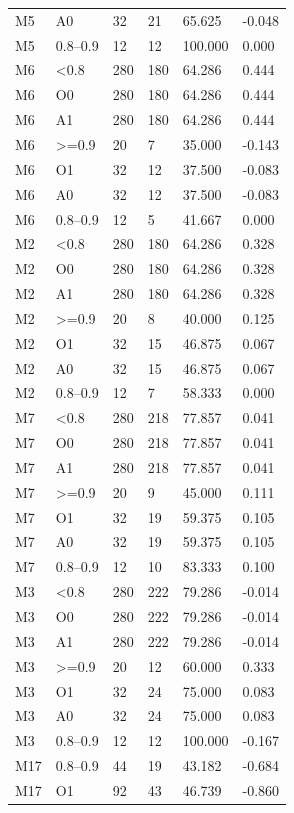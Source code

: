 {\begin{longtable}{llllll}
M5 & A0 & 32 & 21 & 65.625 & -0.048 \\
M5 & 0.8–0.9 & 12 & 12 & 100.000 & 0.000 \\
M6 & \textless{}0.8 & 280 & 180 & 64.286 & 0.444 \\
M6 & O0 & 280 & 180 & 64.286 & 0.444 \\
M6 & A1 & 280 & 180 & 64.286 & 0.444 \\
M6 & \textgreater{}=0.9 & 20 & 7 & 35.000 & -0.143 \\
M6 & O1 & 32 & 12 & 37.500 & -0.083 \\
M6 & A0 & 32 & 12 & 37.500 & -0.083 \\
M6 & 0.8–0.9 & 12 & 5 & 41.667 & 0.000 \\
M2 & \textless{}0.8 & 280 & 180 & 64.286 & 0.328 \\
M2 & O0 & 280 & 180 & 64.286 & 0.328 \\
M2 & A1 & 280 & 180 & 64.286 & 0.328 \\
M2 & \textgreater{}=0.9 & 20 & 8 & 40.000 & 0.125 \\
M2 & O1 & 32 & 15 & 46.875 & 0.067 \\
M2 & A0 & 32 & 15 & 46.875 & 0.067 \\
M2 & 0.8–0.9 & 12 & 7 & 58.333 & 0.000 \\
M7 & \textless{}0.8 & 280 & 218 & 77.857 & 0.041 \\
M7 & O0 & 280 & 218 & 77.857 & 0.041 \\
M7 & A1 & 280 & 218 & 77.857 & 0.041 \\
M7 & \textgreater{}=0.9 & 20 & 9 & 45.000 & 0.111 \\
M7 & O1 & 32 & 19 & 59.375 & 0.105 \\
M7 & A0 & 32 & 19 & 59.375 & 0.105 \\
M7 & 0.8–0.9 & 12 & 10 & 83.333 & 0.100 \\
M3 & \textless{}0.8 & 280 & 222 & 79.286 & -0.014 \\
M3 & O0 & 280 & 222 & 79.286 & -0.014 \\
M3 & A1 & 280 & 222 & 79.286 & -0.014 \\
M3 & \textgreater{}=0.9 & 20 & 12 & 60.000 & 0.333 \\
M3 & O1 & 32 & 24 & 75.000 & 0.083 \\
M3 & A0 & 32 & 24 & 75.000 & 0.083 \\
M3 & 0.8–0.9 & 12 & 12 & 100.000 & -0.167 \\
M17 & 0.8–0.9 & 44 & 19 & 43.182 & -0.684 \\
M17 & O1 & 92 & 43 & 46.739 & -0.860 \\

\end{longtable}}
